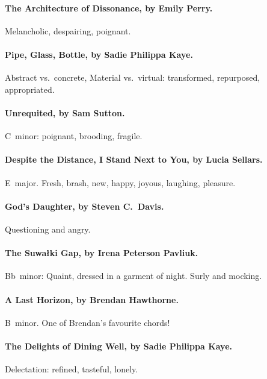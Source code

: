 \paragraph{The Architecture of Dissonance, by Emily Perry.} %
Melancholic, despairing, poignant.

\paragraph{Pipe, Glass, Bottle, by Sadie Philippa Kaye.} %
Abstract vs.~concrete, Material vs.~virtual: transformed, repurposed,
appropriated.

\paragraph{Unrequited, by Sam Sutton.} %
C\sh~minor: poignant, brooding, fragile.

\paragraph{Despite the Distance, I Stand Next to You, by Lucia Sellars.} %
E~major. Fresh, brash, new, happy, joyous, laughing, pleasure.

\paragraph{God’s Daughter, by Steven C.~Davis.} %
Questioning and angry.


\paragraph{The Suwałki Gap, by Irena Peterson Pavliuk.} %
Bb~minor: Quaint, dressed in a garment of night. Surly and mocking.

\paragraph{A Last Horizon, by Brendan Hawthorne.} %
B~minor. One of Brendan's favourite chords!

\paragraph{The Delights of Dining Well, by Sadie Philippa Kaye.} %
Delectation: refined, tasteful, lonely.

